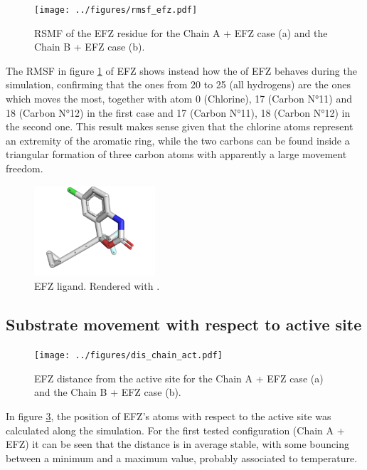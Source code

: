 \documentclass[12pt]{article}
\begin{document}
\begin{figure}[H]
    \centering
    \texttt{[image: ../figures/rmsf\_efz.pdf]}
    \caption{RSMF of the EFZ residue for the Chain A + EFZ case (a) and the Chain B + EFZ case (b).\label{fig:rmsf}}
\end{figure}

The RMSF in figure \ref{fig:rmsf} of EFZ shows instead how the of EFZ behaves during the simulation, confirming that the ones from 20 to 25 (all hydrogens) are the ones which moves the most, together with atom 0 (Chlorine), 17 (Carbon N°11) and 18 (Carbon N°12) in the first case and 17 (Carbon N°11), 18 (Carbon N°12) in the second one. This result makes sense given that the chlorine atoms represent an extremity of the aromatic ring, while the two carbons can be found inside a triangular formation of three carbon atoms with apparently a large movement freedom.

\begin{figure}
    \centering
    \includegraphics[width=0.4\textwidth]{../figures/efz.png}
    \caption{EFZ ligand. Rendered with \cite[Pymol]{pymol}.\label{fig:efz}}
\end{figure}

\subsection{Substrate movement with respect to active site}

\begin{figure}[H]
    \centering
    \texttt{[image: ../figures/dis\_chain\_act.pdf]}
    \caption{EFZ distance from the active site for the Chain A + EFZ case (a) and the Chain B + EFZ case (b).\label{fig:dist}}
\end{figure}

In figure \ref{fig:dist}, the position of EFZ's atoms with respect to the active site was calculated along the simulation. For the first tested configuration (Chain A + EFZ) it can be seen that the distance is in average stable, with some bouncing between a minimum and a maximum value, probably associated to temperature.
\end{document}
